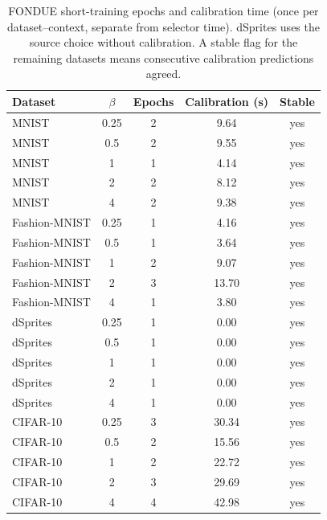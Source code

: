 \begin{table}[H]
\caption{FONDUE short-training epochs and calibration time (once per dataset--context, separate from selector time). dSprites uses the source choice without calibration. A stable flag for the remaining datasets means consecutive calibration predictions agreed.}\label{tab:epochs}
\small
\setlength{\tabcolsep}{3.5pt}
\begin{tabular*}{\textwidth}{@{\extracolsep{\fill}}lcccc@{}}
\toprule
Dataset & $\beta$ & Epochs & Calibration (s) & Stable \\
\midrule
MNIST & 0.25 & 2 & 9.64 & yes \\
MNIST & 0.5 & 2 & 9.55 & yes \\
MNIST & 1 & 1 & 4.14 & yes \\
MNIST & 2 & 2 & 8.12 & yes \\
MNIST & 4 & 2 & 9.38 & yes \\
Fashion-MNIST & 0.25 & 1 & 4.16 & yes \\
Fashion-MNIST & 0.5 & 1 & 3.64 & yes \\
Fashion-MNIST & 1 & 2 & 9.07 & yes \\
Fashion-MNIST & 2 & 3 & 13.70 & yes \\
Fashion-MNIST & 4 & 1 & 3.80 & yes \\
dSprites & 0.25 & 1 & 0.00 & yes \\
dSprites & 0.5 & 1 & 0.00 & yes \\
dSprites & 1 & 1 & 0.00 & yes \\
dSprites & 2 & 1 & 0.00 & yes \\
dSprites & 4 & 1 & 0.00 & yes \\
CIFAR-10 & 0.25 & 3 & 30.34 & yes \\
CIFAR-10 & 0.5 & 2 & 15.56 & yes \\
CIFAR-10 & 1 & 2 & 22.72 & yes \\
CIFAR-10 & 2 & 3 & 29.69 & yes \\
CIFAR-10 & 4 & 4 & 42.98 & yes \\
\bottomrule
\end{tabular*}
\end{table}
